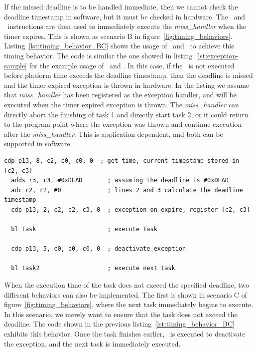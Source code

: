 If the missed deadline is to be handled immediate, then we cannot check the deadline timestamp in software, but it must be checked in hardware.  
The \exceptiononexpire\ and \deactivateexception\ instructions are then used to immediately execute the \emph{miss\_handler} when the timer expires.
This is shown as scenario B in figure~\ref{fig:timing_behaviors}.
Listing~\ref{lst:timing_behavior_BC} shows the usage of \exceptiononexpire\ and \deactivateexception\ to achieve this timing behavior.
The code is similar the one showed in listing~\ref{lst:exception-sample} for the example usage of \exceptiononexpire\ and \deactivateexception.
In this case, if the \deactivateexception\ is not executed before platform time exceeds the deadline timestamp, then the deadline is missed and the timer expired exception is thrown in hardware.
In the listing we assume that \emph{miss\_handler} has been registered as the exception handler, and will be executed when the timer expired exception is thrown.
The \emph{miss\_handler} can directly abort the finishing of task 1 and directly start task 2, or it could return to the program point where the exception was thrown and continue execution after the \emph{miss\_handler}. 
This is application dependent, and both can be supported in software.   

\begin{lstlisting}[float=h, label=lst:timing_behavior_BC,caption=Assembly code to implement scenario B and C]
  cdp p13, 8, c2, c0, c0, 0  ; get_time, current timestamp stored in [c2, c3]
  adds r3, r3, #0xDEAD       ; assuming the deadline is #0xDEAD
  adc r2, r2, #0             ; lines 2 and 3 calculate the deadline timestamp
  cdp p13, 2, c2, c2, c3, 0  ; exception_on_expire, register [c2, c3]
   
  bl task                    ; execute Task
  
  cdp p13, 5, c0, c0, c0, 0  ; deactivate_exception
     
  bl task2                   ; execute next task
\end{lstlisting}

When the execution time of the task does not exceed the specified deadline, two different behaviors can also be implemented.
The first is shown in scenario C of figure~\ref{fig:timing_behaviors}, where the next task immediately begins to execute.
In this scenario, we merely want to ensure that the task does not exceed the deadline. 
The code shown in the previous listing~\ref{lst:timing_behavior_BC} exhibits this behavior. 
Once the task finishes earlier, \deactivateexception\ is executed to deactivate the exception, and the next task is immediately executed.

